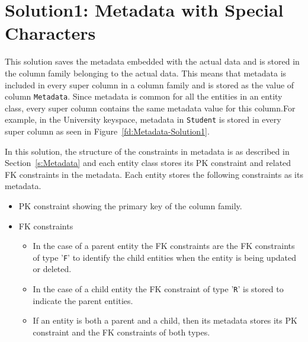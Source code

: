 \section{Solution1:  Metadata with Special Characters} \label{s:design-sol1}

	This solution saves the metadata embedded with the actual data and is stored in
	the column family belonging to the actual data. This means that metadata is
	included in every super column in a column family and is stored as the 
	value of column \texttt{Metadata}. Since metadata is common for all the entities in an entity
	class, every super column contains the same metadata value for this column.For
	example, in the University keyspace, metadata in \texttt{Student} is stored in
	every super column as seen in Figure~\ref{fd:Metadata-Solution1}.
	
		
	In this solution, the structure of the constraints in metadata is as described
	in Section~\ref{s:Metadata} and each entity class stores  its \ac{PK}
	constraint and related \ac{FK} constraints in the metadata. 
	Each entity stores the following constraints as its metadata.
	
		\begin{itemize}
		  \item  \ac{PK} constraint showing the primary key of the column family.
		  \item \ac{FK} constraints 
				\begin{itemize}
					\item In the case of a parent entity the \ac{FK} constraints are the \ac{FK}
					constraints of type '\texttt{F}' to identify the child entities when the entity
					is being updated or deleted.
					\item  In the case of a child entity the \ac{FK} constraint of type '\texttt{R}'
					is stored to indicate the parent entities.
					\item If an entity is both a parent and a child, then its metadata
					stores its \ac{PK} constraint and the \ac{FK} constraints of both types.
				\end{itemize}
		\end{itemize}
		

